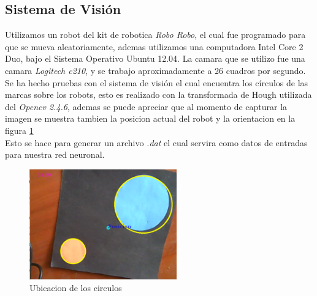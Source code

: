 \documentclass[conference]{IEEEtran}
\begin{document}
\subsection{Sistema de Visi\'on}
Utilizamos un robot del kit de robotica \textit{Robo Robo},  el cual fue programado para que se mueva aleatoriamente, ademas utilizamos una computadora Intel Core 2 Duo, bajo el Sistema Operativo Ubuntu 12.04. La camara que se utilizo fue una camara \textit{Logitech c210}, y se trabajo aproximadamente a 26 cuadros por segundo.\\
Se ha hecho pruebas con el sistema de visi\'on el cual encuentra los c\'irculos de las marcas sobre los robots, esto es realizado con la transformada de Hough utilizada del \textit{Opencv 2.4.6}, ademas se puede apreciar que al momento de capturar la imagen se muestra tambien la posicion actual del robot y la orientacion en la figura  \ref{fig_ubi} \\
 Esto se hace para generar un archivo \textit{.dat} el cual servira como datos de entradas para nuestra red neuronal.
\begin{figure}
	\centering
	\includegraphics[width=2.5in]{visi.pdf}
	
	\caption{Ubicacion de los circulos}
	\label{fig_ubi}
\end{figure}
\end{document}
